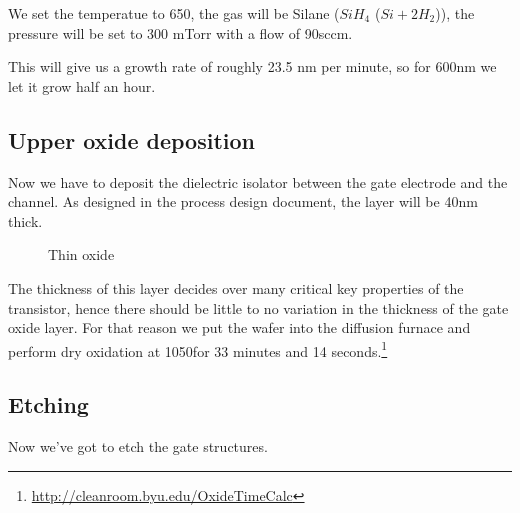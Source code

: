We set the temperatue to 650\degreesC, the gas will be Silane ($Si H_4$ ($Si + 2H_2$)), the pressure will be set to 300 mTorr with a flow of 90sccm.

This will give us a growth rate of roughly 23.5 nm per minute, so for 600nm we let it grow half an hour.

\newpage

\subsection{Upper oxide deposition}\label{step_growing_gate_oxide}

Now we have to deposit the dielectric isolator between the gate electrode and the channel.
As designed in the process design document, the layer will be 40nm thick.

\begin{figure}[H]
	\centering
	\begin{tikzpicture}[node distance = 3cm, auto, thick,scale=\CrossSectionOnly, every node/.style={transform shape}]
		
	\end{tikzpicture}
	\begin{tikzpicture}[node distance = 3cm, auto, thick,scale=\CrossSectionOnly, every node/.style={transform shape}]
		
	\end{tikzpicture}
	\caption{Thin oxide}
\end{figure}
The thickness of this layer decides over many critical key properties of the transistor, hence there should be little to no variation in the thickness of the gate oxide layer.
For that reason we put the wafer into the diffusion furnace and perform dry oxidation at 1050\degreesC for 33 minutes and 14 seconds.\footnote{\url{http://cleanroom.byu.edu/OxideTimeCalc}}

\newpage

\subsection{Etching}

Now we've got to etch the gate structures.

